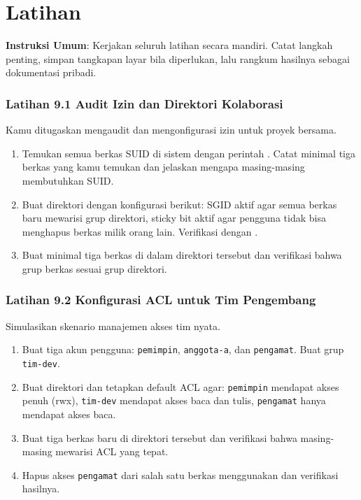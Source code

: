 \section{Latihan}
\label{sec:latihan-user-group}

\textbf{Instruksi Umum}: Kerjakan seluruh latihan secara mandiri. Catat langkah penting, simpan tangkapan layar bila diperlukan, lalu rangkum hasilnya sebagai dokumentasi pribadi.

\subsubsection*{Latihan 9.1 Audit Izin dan Direktori Kolaborasi}
Kamu ditugaskan mengaudit dan mengonfigurasi izin untuk proyek bersama.
\begin{enumerate}
    \item Temukan semua berkas SUID di sistem dengan perintah . Catat minimal tiga berkas yang kamu temukan dan jelaskan mengapa masing-masing membutuhkan SUID.
    \item Buat direktori  dengan konfigurasi berikut: SGID aktif agar semua berkas baru mewarisi grup direktori, sticky bit aktif agar pengguna tidak bisa menghapus berkas milik orang lain. Verifikasi dengan .
    \item Buat minimal tiga berkas di dalam direktori tersebut dan verifikasi bahwa grup berkas sesuai grup direktori.
\end{enumerate}


\subsubsection*{Latihan 9.2 Konfigurasi ACL untuk Tim Pengembang}
Simulasikan skenario manajemen akses tim nyata.
\begin{enumerate}
    \item Buat tiga akun pengguna: \texttt{pemimpin}, \texttt{anggota-a}, dan \texttt{pengamat}. Buat grup \texttt{tim-dev}.
    \item Buat direktori  dan tetapkan default ACL agar: \texttt{pemimpin} mendapat akses penuh (rwx), \texttt{tim-dev} mendapat akses baca dan tulis, \texttt{pengamat} hanya mendapat akses baca.
    \item Buat tiga berkas baru di direktori tersebut dan verifikasi bahwa masing-masing mewarisi ACL yang tepat.
    \item Hapus akses \texttt{pengamat} dari salah satu berkas menggunakan  dan verifikasi hasilnya.
\end{enumerate}


